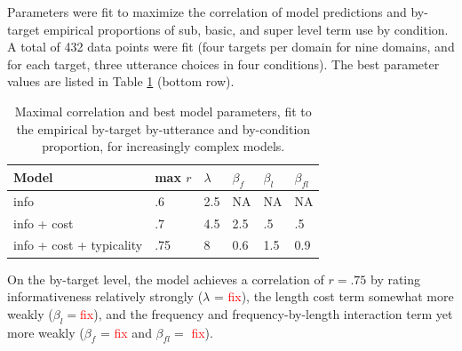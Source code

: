 \documentclass[10pt,letterpaper]{article}
\newcommand{\red}[1]{\textcolor{Red}{#1}}
\newcommand{\denote}[1]{\mbox{ $[\![ #1 ]\!]$}}
\newcommand{\tableref}[1]{Table \ref{#1}}
\begin{document}

Parameters were fit to maximize the correlation of model predictions and by-target empirical proportions of sub, basic, and super level term use by condition. A total of 432 data points were fit (four targets per domain for nine domains, and for each target, three utterance choices in four conditions). The best parameter values are listed in \tableref{tab:bestparams} (bottom row). 

\begin{table}
\caption{Maximal correlation and best model parameters, fit to the empirical by-target by-utterance and by-condition proportion, for increasingly complex models.}
\begin{center}
	\begin{tabular}{l l l l l l}
	\toprule
	Model & max $r$ & $\lambda$ & $\beta_f$ & $\beta_l$ & $\beta_{fl}$\\
	\midrule
	info & .6 & 2.5 & NA & NA & NA\\
	info + cost  & .7 & 4.5 & 2.5 & .5 & .5  \\
	info + cost + typicality  & .75 & 8 & 0.6 & 1.5 & 0.9   \\
	\bottomrule
	\end{tabular}	
\end{center}
\label{tab:bestparams}
\end{table}

On the by-target level, the model achieves a correlation of $r = .75$ by rating informativeness relatively strongly ($\lambda$ = \red{fix}), the length cost term somewhat more weakly ($\beta_l =$\red{fix}), and the frequency and frequency-by-length interaction term yet more weakly ($\beta_f$ = \red{fix} and $\beta_{fl} =$ \red{fix}).
\end{document}
